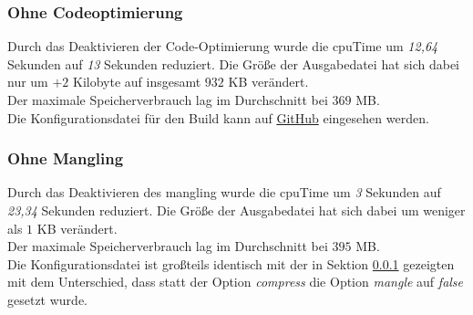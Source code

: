 \documentclass[11pt]{report}
\begin{document}
        		\subsubsection{Ohne Codeoptimierung}
        			\label{section:minification_noCompress}
	        		Durch das Deaktivieren der Code-Optimierung wurde die \Gls{cpuTime} um \emph{12,64} Sekunden auf \emph{13} Sekunden reduziert. Die Größe der Ausgabedatei hat sich dabei nur um $+2$ Kilobyte auf insgesamt $932$ KB verändert.\\
	        		Der maximale Speicherverbrauch lag im Durchschnitt bei $369$ MB.\\
		        	Die Konfigurationsdatei für den Build kann auf \href{https://github.com/TexNAK/WebBundlerOptimization/compare/master...nondestr_scopedCompilation#diff-1fb5683b1e7adbcee273b7f9f9a08a22}{GitHub} eingesehen werden.
		        	

        		\subsubsection{Ohne Mangling}
	        		Durch das Deaktivieren des \Gls{mangling} wurde die \Gls{cpuTime} um \emph{3} Sekunden auf \emph{23,34} Sekunden reduziert. Die Größe der Ausgabedatei hat sich dabei um weniger als $1$ KB verändert.\\
	        		Der maximale Speicherverbrauch lag im Durchschnitt bei $395$ MB.\\
        			Die Konfigurationsdatei ist großteils identisch mit der in Sektion \ref{section:minification_noCompress} gezeigten mit dem Unterschied, dass statt der Option \emph{compress} die Option \emph{mangle} auf \emph{false} gesetzt wurde.
        			
\end{document}
